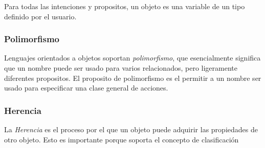 \documentclass[]{article}
\begin{document}
			Para todas las intenciones y propositos, un objeto es una variable de un tipo definido por el usuario.
		
			\subsubsection{Polimorfismo}
			
			Lenguajes orientados a objetos soportan \textit{polimorfismo}, que esencialmente significa que un nombre puede ser usado para varios relacionados, pero ligeramente diferentes propositos. El proposito de polimorfismo es el permitir a un nombre ser usado para especificar una clase general de acciones.
			
			\subsubsection{Herencia}
			
			La \textit{Herencia} es el proceso por el que un objeto puede adquirir las propiedades de otro objeto. Esto es importante porque soporta el concepto de clasificación 
			
			
			
			
\end{document}
